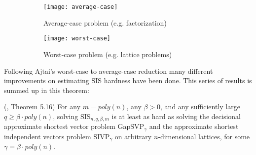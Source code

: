 


\begin{figure}[H]
    \centering
    
    \begin{figure}[H]
        \centering
        \texttt{[image: average-case]}
        \caption{Average-case problem (e.g. factorization)}
    \end{figure}
    
    
    \begin{figure}[H]
        \centering
        \texttt{[image: worst-case]}
        \caption{Worst-case problem (e.g. lattice problems)}
    \end{figure}
    
    
    \caption*{
    }
\end{figure}


Following Ajtai’s worst-case to average-case reduction many different improvements on estimating SIS hardness have been done. This series of results is summed up in this theorem:

\begin{theorem}
\normalfont
(\cite{Micciancio:2007:WAR:1328722.1328733}, Theorem 5.16)
For any $m = poly(n)$, any $\beta > 0$, and any sufficiently large $q \ge \beta \cdot poly(n)$, solving SIS$_{n,q,\beta,m}$ is at least as hard as solving the decisional approximate shortest vector problem GapSVP$_{\gamma}$ and the approximate shortest
independent vectors problem SIVP$_\gamma$ on arbitrary $n$-dimensional lattices, for
some $\gamma = \beta \cdot poly(n)$.
\end{theorem}

